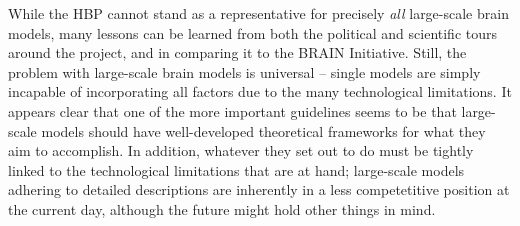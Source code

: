 \documentclass[10pt]{article}\usepackage[]{graphicx}\usepackage[]{color}
\theoremstyle{plain}
\newcommand{\CC}{{\color{Red} \bf CITE}}
\begin{document}
\begin{multicols*}{2}
	  While the HBP cannot stand as a representative for precisely \textit{all} large-scale brain models, many lessons can be learned from both the political and scientific tours around the project, and in comparing it to the BRAIN Initiative. Still, the problem with large-scale brain models is universal -- single models are simply incapable of incorporating all factors due to the many technological limitations. It appears clear that one of the more important guidelines seems to be that large-scale models should have well-developed theoretical frameworks for what they aim to accomplish. In addition, whatever they set out to do must be tightly linked to the technological limitations that are at hand; large-scale models adhering to detailed descriptions are inherently in a less competetitive position at the current day, although the future might hold other things in mind.
	  
	  
	  
	  
	  
	  
	  
	  
		
					        
					        
					        

\end{multicols*}
\end{document}
